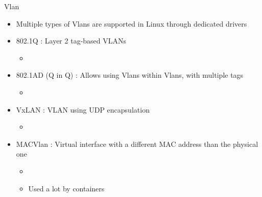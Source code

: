 \begin{frame}{Vlan}
	\begin{itemize}
		\item Multiple types of Vlans are supported in Linux through dedicated drivers
		\item 802.1Q : Layer 2 tag-based VLANs
			\begin{itemize}
				\item {}
			\end{itemize}
		\item 802.1AD (Q in Q) : Allows using Vlans within Vlans, with multiple tags
			\begin{itemize}
				\item {}
			\end{itemize}
		\item VxLAN : VLAN using UDP encapsulation
			\begin{itemize}
				\item {}
			\end{itemize}
		\item MACVlan : Virtual interface with a different MAC address than the physical one
			\begin{itemize}
				\item {}
				\item Used a lot by containers
			\end{itemize}
	\end{itemize}
\end{frame}

